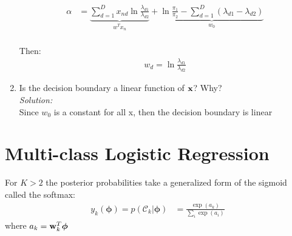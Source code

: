 \documentclass[12pt,a4paper]{article}
\newcommand{\xscalar}{x}
\newcommand{\xvec}{{\bf \xscalar}}
\newcommand{\wscalar}{w}
\newcommand{\wvec}{{\bf \wscalar}}
\newcommand{\phivec}{\boldsymbol{\phi}}
\newcommand{\class}{\mathcal{C}}
\begin{document}
\begin{enumerate}
		\begin{align*}
			\alpha &= \underbrace{\sum_{d=1}^{D} x_{nd} \ln\frac{\lambda_{d1}}{\lambda_{d2}}}_{w^{T} x_n}  + \underbrace{\ln \frac{\pi_1}{\pi_2} - \sum_{d=1}^{D}(\lambda_{d1} - \lambda_{d2})}_{w_0} \\
		\end{align*}
		
		Then: 
		\begin{align*}
			w_d = \ln\frac{\lambda_{d1}}{\lambda_{d2}}
		\end{align*}
		
		
		\item Is the decision boundary a linear function of $\xvec$? Why? \\
		\emph{Solution:} \\
		Since $w_0$ is a constant for all x, then the decision boundary is linear
		
	\end{enumerate}
	
	\vspace{0.25in}
	\section{Multi-class Logistic Regression}
	For $K > 2$ the posterior probabilities take a generalized form of the sigmoid called the softmax:
	\begin{align*}
		y_{k}(\phivec) = p(\class_{k} | \phivec ) &=
		\frac{\exp(a_{k})}{\sum_i \exp(a_{i})}
	\end{align*}
	where $a_{k} = \wvec_{k}^{T} \phivec$
	
\end{document}
